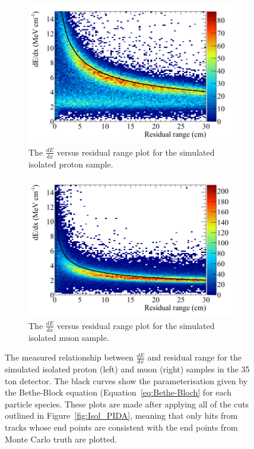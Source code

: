\begin{figure}
  \centering
  \begin{subfigure}{0.48\textwidth}
        \centering
        \includegraphics[width=\textwidth]{IsolatedProtons_500V_Dec16_Proton_dEdx}
        \caption{The $\frac{dE}{dx}$ versus residual range plot for the simulated isolated proton sample.}
        \label{fig:Isol_dEdx_Proton}
  \end{subfigure}%
  \hspace{0.03\textwidth}%
  \begin{subfigure}{0.48\textwidth}
        \centering
        \includegraphics[width=\textwidth]{IsolatedMuons_500V_Dec16_Muon_dEdx}
        \caption{The $\frac{dE}{dx}$ versus residual range plot for the simulated isolated muon sample.}
        \label{fig:Isol_dEdx_Muon}
  \end{subfigure}
  \caption[The $\frac{dE}{dx}$ versus residual range plot for the simulated isolated proton and muon samples in the 35 ton detector.]
          {The measured relationship between $\frac{dE}{dx}$ and residual range for the simulated isolated proton (left) and muon (right) samples in the 35 ton detector. The black curves show the parameterisation given by the Bethe-Block equation (Equation~\ref{eq:Bethe-Bloch} for each particle species. These plots are made after applying all of the cuts outlined in Figure~\ref{fig:Isol_PIDA}, meaning that only hits from tracks whose end points are consistent with the end points from Monte Carlo truth are plotted.}
  \label{fig:Isol_dEdx}
\end{figure}

